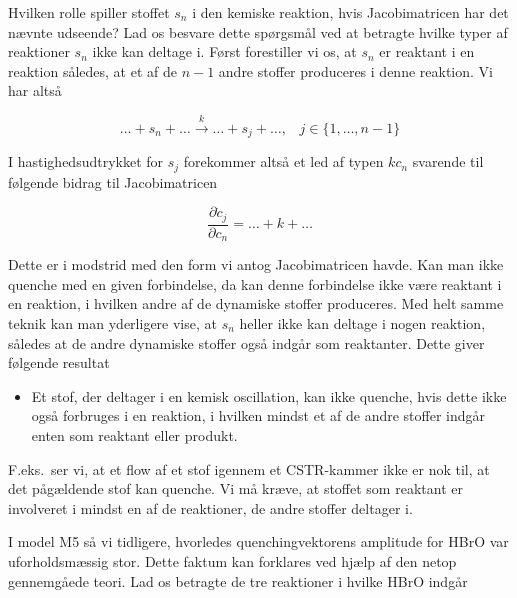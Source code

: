\vspace{4.0mm}
Hvilken rolle spiller stoffet $s_n$ i den kemiske
reaktion, hvis Jacobimatricen har det n{\ae}vnte
udseende? Lad os besvare dette sp{\o}rgsm{\aa}l ved at
betragte hvilke typer af reaktioner $s_n$ ikke kan deltage
i. F{\o}rst forestiller vi os, at $s_n$ er reaktant i en
reaktion s{\aa}ledes, at et af de $n-1$ andre stoffer
produceres i denne reaktion. Vi har alts{\aa}

\begin{equation}
  \ldots + s_n + \ldots \stackrel{k}{\longrightarrow}
  \ldots + s_j + \ldots, \;\;\; j \in \{1,\ldots,n-1 \}
\end{equation}

I hastighedsudtrykket for $s_j$ forekommer alts{\aa} et
led af typen $k c_n$ svarende til f{\o}lgende bidrag til
Jacobimatricen

\begin{equation}
  \frac{\partial \dot{c}_j}{\partial c_n} = \ldots + k + \ldots
\end{equation}

Dette er i modstrid med den form vi antog Jacobimatricen
havde. Kan man ikke quenche med en given forbindelse, da
kan denne forbindelse ikke v{\ae}re reaktant i en reaktion,
i hvilken andre af de dynamiske stoffer produceres. Med
helt samme teknik kan man yderligere vise, at $s_n$ heller
ikke kan deltage i nogen reaktion, s{\aa}ledes at de andre
dynamiske stoffer ogs{\aa} indg{\aa}r som reaktanter. Dette
giver f{\o}lgende resultat

\begin{itemize}
  \item Et stof, der deltager i en kemisk oscillation, kan
  ikke quenche, hvis dette ikke ogs{\aa} forbruges i en
  reaktion, i hvilken mindst et af de andre stoffer
  indg{\aa}r enten som reaktant eller produkt.
\end{itemize}

F.eks.\ ser vi, at et flow af et stof igennem et
CSTR-kammer ikke er nok til, at det p{\aa}g{\ae}ldende stof
kan quenche. Vi m{\aa} kr{\ae}ve, at stoffet som reaktant
er involveret i mindst en af de reaktioner, de andre
stoffer deltager i.

\vspace{4.0mm}
I model M5 s{\aa} vi tidligere, hvorledes
quenchingvektorens amplitude for HBrO var
uforholdsm{\ae}ssig stor. Dette faktum kan forklares ved
hj{\ae}lp af den netop gennemg{\aa}ede teori. Lad os
betragte de tre reaktioner i hvilke HBrO indg{\aa}r

